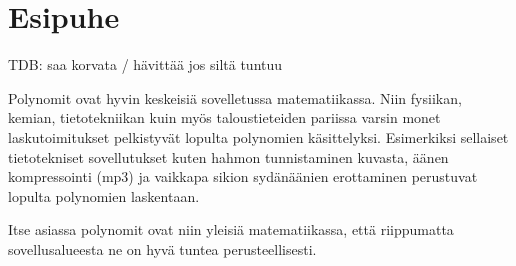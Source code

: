 \chapter*{Esipuhe}

TDB: saa korvata / hävittää jos siltä tuntuu

Polynomit ovat hyvin keskeisiä sovelletussa matematiikassa.
Niin fysiikan, kemian, tietotekniikan kuin myös taloustieteiden
pariissa varsin monet laskutoimitukset pelkistyvät lopulta
polynomien käsittelyksi. Esimerkiksi sellaiset tietotekniset
sovellutukset kuten hahmon tunnistaminen kuvasta, äänen
kompressointi (mp3) ja vaikkapa sikion sydänäänien erottaminen
perustuvat lopulta polynomien laskentaan.

Itse asiassa polynomit ovat niin yleisiä matematiikassa, että riippumatta
sovellusalueesta ne on hyvä tuntea perusteellisesti.
